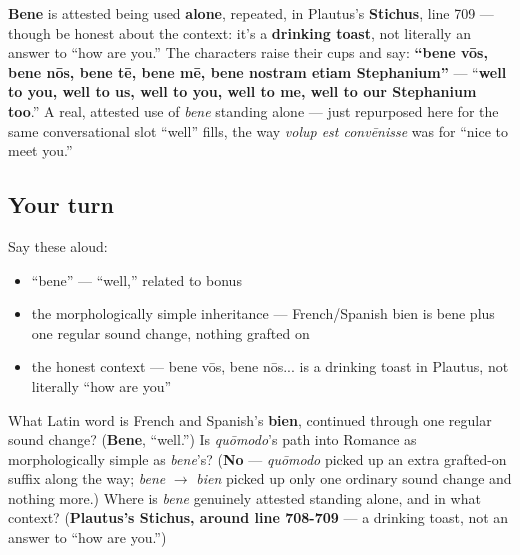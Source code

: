 \begin{culture}
\textbf{Bene} is attested being used \textbf{alone}, repeated, in Plautus's \textbf{Stichus}, line 709 — though be honest about the context: it's a \textbf{drinking toast}, not literally an answer to \textquotedblleft{}how are you.\textquotedblright{} The characters raise their cups and say: \textbf{\textquotedblleft{}bene vōs, bene nōs, bene tē, bene mē, bene nostram etiam Stephanium\textquotedblright{}} — \textquotedblleft{}\textbf{well to you, well to us, well to you, well to me, well to our Stephanium too}.\textquotedblright{} A real, attested use of \emph{bene} standing alone — just repurposed here for the same conversational slot \textquotedblleft{}well\textquotedblright{} fills, the way \emph{volup est convēnisse} was for \textquotedblleft{}nice to meet you.\textquotedblright{}
\end{culture}

\subsection*{Your turn}
Say these aloud:

\begin{itemize}
\raggedright
  \item \textquotedblleft{}bene\textquotedblright{} — \textquotedblleft{}well,\textquotedblright{} related to bonus
  \item the morphologically simple inheritance — French/Spanish bien is bene plus one regular sound change, nothing grafted on
  \item the honest context — bene vōs, bene nōs... is a drinking toast in Plautus, not literally \textquotedblleft{}how are you\textquotedblright{}
\end{itemize}

\begin{tcolorbox}[breakable,colback=teal!4,colframe=teal!35!black,title={Before you move on}]
What Latin word is French and Spanish's \textbf{bien}, continued through one regular sound change? (\textbf{Bene}, \textquotedblleft{}well.\textquotedblright{}) Is \emph{quōmodo}'s path into Romance as morphologically simple as \emph{bene}'s? (\textbf{No} — \emph{quōmodo} picked up an extra grafted-on suffix along the way; \emph{bene} $\to$ \emph{bien} picked up only one ordinary sound change and nothing more.) Where is \emph{bene} genuinely attested standing alone, and in what context? (\textbf{Plautus's Stichus, around line 708-709} — a drinking toast, not an answer to \textquotedblleft{}how are you.\textquotedblright{})
\end{tcolorbox}
